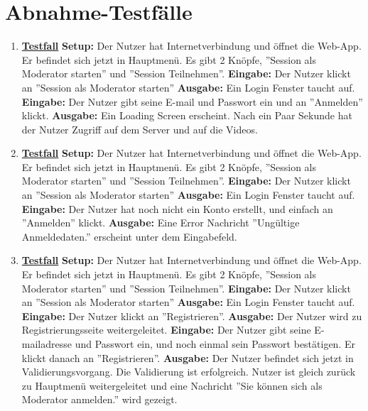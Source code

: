 \section{Abnahme-Testfälle}
\begin{enumerate}
	\item \underline{\textbf{Testfall}} \linebreak
	\textbf{Setup:} Der Nutzer hat Internetverbindung und öffnet die Web-App. Er befindet sich jetzt in Hauptmenü. Es gibt 2 Knöpfe, ''Session als Moderator starten'' und ''Session Teilnehmen''.\linebreak
	\textbf{Eingabe:} Der Nutzer klickt an ''Session als Moderator starten''\linebreak
	\textbf{Ausgabe:} Ein Login Fenster taucht auf.\linebreak
	\textbf{Eingabe:} Der Nutzer gibt seine E-mail und Passwort ein und an ''Anmelden'' klickt.\linebreak
	\textbf{Ausgabe:} Ein Loading Screen erscheint. Nach ein Paar Sekunde hat der Nutzer Zugriff auf dem Server und auf die Videos.
	
	\item \underline{\textbf{Testfall}} \linebreak
	\textbf{Setup:} Der Nutzer hat Internetverbindung und öffnet die Web-App. Er befindet sich jetzt in Hauptmenü. Es gibt 2 Knöpfe, ''Session als Moderator starten'' und ''Session Teilnehmen''. \linebreak
	\textbf{Eingabe:} Der Nutzer klickt an ''Session als Moderator starten'' \linebreak
	\textbf{Ausgabe:} Ein Login Fenster taucht auf.\linebreak
	\textbf{Eingabe:} Der Nutzer hat noch nicht ein Konto erstellt, und einfach an ''Anmelden'' klickt.\linebreak
	\textbf{Ausgabe:} Eine Error Nachricht ''Ungültige Anmeldedaten.'' erscheint unter dem Eingabefeld.
	
	\item \underline{\textbf{Testfall}} \linebreak
	\textbf{Setup:} Der Nutzer hat Internetverbindung und öffnet die Web-App. Er befindet sich jetzt in Hauptmenü. Es gibt 2 Knöpfe, ''Session als Moderator starten'' und ''Session Teilnehmen''.\linebreak
	\textbf{Eingabe:} Der Nutzer klickt an ''Session als Moderator starten'' \linebreak
	\textbf{Ausgabe:} Ein Login Fenster taucht auf.\linebreak
	\textbf{Eingabe:} Der Nutzer klickt an ''Registrieren''.\linebreak
	\textbf{Ausgabe:} Der Nutzer wird zu Registrierungsseite weitergeleitet.\linebreak
	\textbf{Eingabe:} Der Nutzer gibt seine E-mailadresse und Passwort ein, und noch einmal sein Passwort bestätigen. Er klickt danach an ''Registrieren''. \linebreak
	\textbf{Ausgabe:} Der Nutzer befindet sich jetzt in Validierungsvorgang. Die Validierung ist erfolgreich. Nutzer ist gleich zurück zu Hauptmenü weitergeleitet und eine Nachricht ''Sie können sich als Moderator anmelden.'' wird gezeigt.
	

\end{enumerate}
